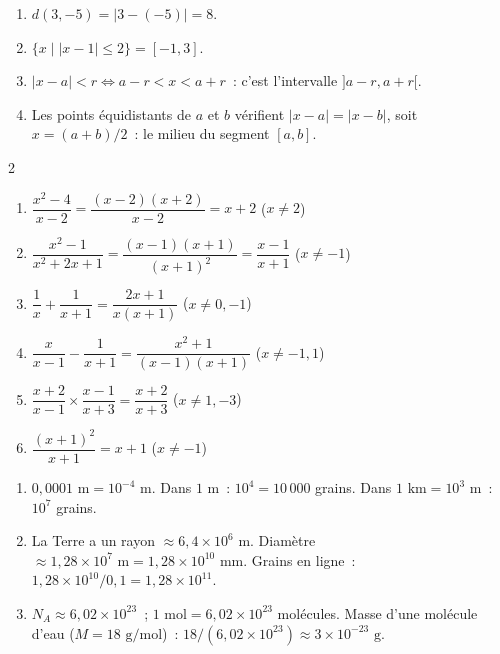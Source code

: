 
\begin{enumerate}
  \item $d(3,-5)=|3-(-5)|=8$.
  \item $\{x\mid|x-1|\leq2\}=[-1,3]$.
  \item $|x-a|<r\Leftrightarrow a-r<x<a+r$~: c'est l'intervalle $]a-r,a+r[$.
  \item Les points \'equidistants de $a$ et $b$ v\'erifient $|x-a|=|x-b|$,
        soit $x=(a+b)/2$~: le milieu du segment $[a,b]$.
\end{enumerate}


\begin{multicols}{2}
\begin{enumerate}
  \item $\dfrac{x^2-4}{x-2}=\dfrac{(x-2)(x+2)}{x-2}=x+2$ ($x\ne2$)
  \item $\dfrac{x^2-1}{x^2+2x+1}=\dfrac{(x-1)(x+1)}{(x+1)^2}=\dfrac{x-1}{x+1}$ ($x\ne-1$)
  \item $\dfrac1x+\dfrac1{x+1}=\dfrac{2x+1}{x(x+1)}$
        ($x\ne0,-1$)
  \item $\dfrac{x}{x-1}-\dfrac1{x+1}
        =\dfrac{x^2+1}{(x-1)(x+1)}$ ($x\ne-1,1$)
  \item $\dfrac{x+2}{x-1}\times\dfrac{x-1}{x+3}
        =\dfrac{x+2}{x+3}$ ($x\ne1,-3$)
  \item $\dfrac{(x+1)^2}{x+1}=x+1$ ($x\ne-1$)
\end{enumerate}
\end{multicols}


\begin{enumerate}
  \item $0{,}0001\text{ m}=10^{-4}\text{ m}$.
        Dans $1\text{ m}$~: $10^4=10\,000$ grains. Dans $1\text{ km}=10^3\text{ m}$~:
        $10^7$ grains.
  \item La Terre a un rayon $\approx6{,}4\times10^6\text{ m}$.
        Diam\`etre $\approx1{,}28\times10^7\text{ m}=1{,}28\times10^{10}\text{ mm}$.
        Grains en ligne~: $1{,}28\times10^{10}/0{,}1=1{,}28\times10^{11}$.
  \item $N_A\approx6{,}02\times10^{23}$~; $1\text{ mol}=6{,}02\times10^{23}$ mol\'ecules.
        Masse d'une mol\'ecule d'eau ($M=18\text{ g/mol}$)~:
        $18/(6{,}02\times10^{23})\approx3\times10^{-23}\text{ g}$.
\end{enumerate}


